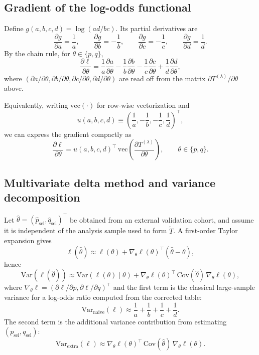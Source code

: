\documentclass[pdflatex,sn-mathphys-num]{sn-jnl}%
\theoremstyle{thmstyleone}%
\theoremstyle{thmstyletwo}%
\theoremstyle{thmstylethree}%
\begin{document}
\subsection*{Gradient of the log-odds functional}

Define $g(a,b,c,d)=\log(ad/bc)$. Its partial derivatives are
\[
\frac{\partial g}{\partial a}=\frac{1}{a},\qquad
\frac{\partial g}{\partial b}=-\frac{1}{b},\qquad
\frac{\partial g}{\partial c}=-\frac{1}{c},\qquad
\frac{\partial g}{\partial d}=\frac{1}{d}.
\]
By the chain rule, for $\theta\in\{p,q\}$,
\[
\frac{\partial \ell}{\partial \theta}
=
\frac{1}{a}\frac{\partial a}{\partial \theta}
-\frac{1}{b}\frac{\partial b}{\partial \theta}
-\frac{1}{c}\frac{\partial c}{\partial \theta}
+\frac{1}{d}\frac{\partial d}{\partial \theta},
\]
where $(\partial a/\partial\theta,\partial b/\partial\theta,\partial c/\partial\theta,\partial d/\partial\theta)$
are read off from the matrix $\partial T^{(\lambda)}/\partial\theta$ above.

Equivalently, writing $\mathrm{vec}(\cdot)$ for row-wise vectorization and
\[
u(a,b,c,d)\equiv \left(\frac{1}{a},-\frac{1}{b},-\frac{1}{c},\frac{1}{d}\right)^\top,
\]
we can express the gradient compactly as
\[
\frac{\partial \ell}{\partial \theta}
=
u(a,b,c,d)^\top\,\mathrm{vec}\!\left(\frac{\partial T^{(\lambda)}}{\partial \theta}\right),
\qquad \theta\in\{p,q\}.
\]

\subsection*{Multivariate delta method and variance decomposition}

Let $\hat\theta=(\hat p_{\mathrm{sel}},\hat q_{\mathrm{sel}})^\top$ be obtained from an external validation cohort,
and assume it is independent of the analysis sample used to form $\tilde T$.
A first-order Taylor expansion gives
\[
\ell(\hat\theta)\approx \ell(\theta) + \nabla_\theta \ell(\theta)^\top(\hat\theta-\theta),
\]
hence
\[
\mathrm{Var}(\ell(\hat\theta))
\approx
\mathrm{Var}(\ell(\theta)\mid \theta)
+
\nabla_\theta \ell(\theta)^\top\,\mathrm{Cov}(\hat\theta)\,\nabla_\theta \ell(\theta),
\]
where $\nabla_\theta \ell = (\partial\ell/\partial p,\partial\ell/\partial q)^\top$ and the first term is the
classical large-sample variance for a log-odds ratio computed from the corrected table:
\[
\mathrm{Var}_{\mathrm{naive}}(\ell)\approx \frac{1}{a}+\frac{1}{b}+\frac{1}{c}+\frac{1}{d}.
\]
The second term is the additional variance contribution from estimating $(p_{\mathrm{sel}},q_{\mathrm{sel}})$:
\[
\mathrm{Var}_{\mathrm{extra}}(\ell)
\approx
\nabla_\theta \ell(\theta)^\top\,\mathrm{Cov}(\hat\theta)\,\nabla_\theta \ell(\theta).
\]
\end{document}
